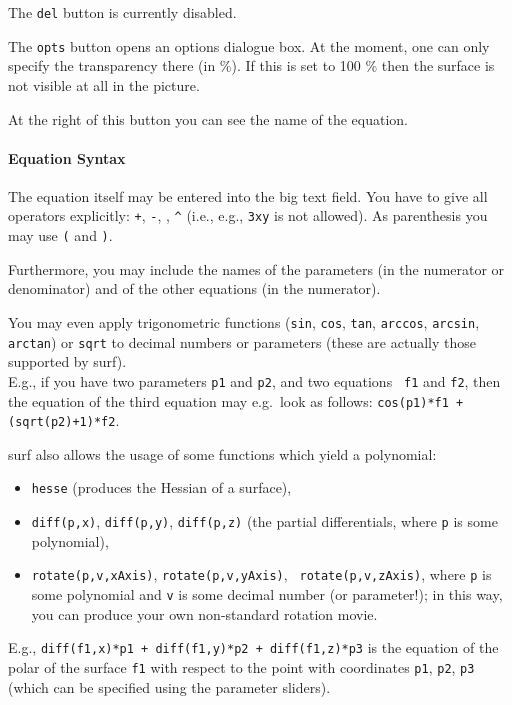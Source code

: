 \documentclass{article}
\begin{document}
The {\tt del} button is currently disabled.

The {\tt opts} button opens an options dialogue box.
At the moment, one can only specify the transparency there (in \%).
If this is set to 100 \% then the surface is not visible at all in the
picture.

At the right of this button you can see the name of the equation.

\paragraph{Equation Syntax}

The equation itself may be entered into the big text field.
You have to give all operators explicitly: {\tt +}, {\tt -}, {\tt *},
{\tt \^{}} (i.e., e.g., {\tt 3xy} is not allowed).
As parenthesis you may use {\tt (} and {\tt )}.

Furthermore, you may include the names of the parameters (in the numerator or
denominator) and of the other equations (in the numerator).

You may even apply trigonometric functions ({\tt sin}, {\tt cos}, {\tt tan},
{\tt arccos}, {\tt arcsin}, {\tt arctan}) or {\tt sqrt} to decimal numbers or
parameters (these are actually those supported by {\sc surf}).\\
E.g., if you have two parameters {\tt p1} and {\tt p2}, and two equations {\tt
  f1} and {\tt f2}, then the equation of the third equation may e.g.\ look as
follows: {\tt cos(p1)*f1 + (sqrt(p2)+1)*f2}.

{\sc surf} also allows the usage of some functions which yield a polynomial:
\begin{itemize}
\item {\tt hesse} (produces the Hessian of a surface),
\item
  {\tt diff(p,x)}, {\tt diff(p,y)}, {\tt diff(p,z)} (the partial
  differentials, where {\tt p} is some polynomial),
\item {\tt rotate(p,v,xAxis)}, {\tt rotate(p,v,yAxis)}, {\tt
  rotate(p,v,zAxis)}, where {\tt p} is some polynomial and {\tt v} is
  some decimal number (or parameter!); in this way, you can produce your own
  non-standard rotation movie.
\end{itemize}

E.g.,
{\tt diff(f1,x)*p1 + diff(f1,y)*p2 + diff(f1,z)*p3}
is the equation of the polar of the surface {\tt f1} with respect to the point
with coordinates {\tt p1}, {\tt p2}, {\tt p3} (which can be specified using
the parameter sliders).
\end{document}
